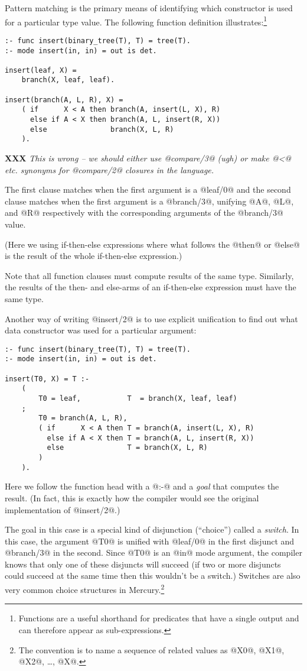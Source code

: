 \documentclass[a4paper,11pt,notitlepage,onecolumn]{article}
\newcommand{\XXX}[1]%
{{\small\textbf{XXX} \emph{#1}}}
\begin{document}
Pattern matching is the primary means of identifying which
constructor is used for a particular type value.  The
following function definition illustrates:\footnote{Functions are a useful shorthand for predicates
that have a single output and can therefore appear as
sub-expressions.}
\begin{verbatim}
:- func insert(binary_tree(T), T) = tree(T).
:- mode insert(in, in) = out is det.

insert(leaf, X) =
    branch(X, leaf, leaf).

insert(branch(A, L, R), X) =
    ( if      X < A then branch(A, insert(L, X), R)
      else if A < X then branch(A, L, insert(R, X))
      else               branch(X, L, R)
    ).
\end{verbatim}
\XXX{This is wrong -- we should either use @compare/3@ (ugh) or make @<@
etc. synonyms for @compare/2@ closures in the language.}

The first clause matches when the first argument is a @leaf/0@
and the second clause matches when the first argument is a
@branch/3@, unifying @A@, @L@, and @R@ respectively with the
corresponding arguments of the @branch/3@ value.

(Here we using if-then-else expressions where what follows the
@then@ or @else@ is the result of the whole if-then-else
expression.)

Note that all function clauses must compute results of the
same type.  Similarly, the results of the then- and else-arms
of an if-then-else expression must have the same type.

Another way of writing @insert/2@ is to use explicit unification
to find out what data constructor was used for a particular
argument:
\begin{verbatim}
:- func insert(binary_tree(T), T) = tree(T).
:- mode insert(in, in) = out is det.

insert(T0, X) = T :-
    (
        T0 = leaf,           T  = branch(X, leaf, leaf)
    ;
        T0 = branch(A, L, R),
        ( if      X < A then T = branch(A, insert(L, X), R)
          else if A < X then T = branch(A, L, insert(R, X))
          else               T = branch(X, L, R)
        )
    ).
\end{verbatim}
Here we follow the function head with a @:-@ and a \emph{goal} that
computes the result.  (In fact, this is exactly how the
compiler would see the original implementation of @insert/2@.)

The goal in this case is a special kind of disjunction
(``choice'') called a \emph{switch}.  In this case, the argument @T0@
is unified with @leaf/0@ in the first disjunct and @branch/3@ in
the second.  Since @T0@ is an @in@ mode argument, the compiler
knows that only one of these disjuncts will succeed (if two or
more disjuncts could succeed at the same time then this
wouldn't be a switch.)  Switches are also very common choice
structures in Mercury.\footnote{The convention is to name a sequence of related
values as @X0@, @X1@, @X2@, \ldots, @X@.}
\end{document}
